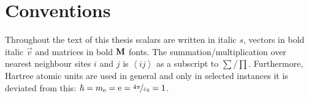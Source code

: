 \documentclass[ 10pt,
                DIV=10,
                headtopline=0.08em,
                headsepline=0.04em,
                headinclude,
                BCOR=6mm
              ]{scrbook}
\begin{document}
    
	\frontmatter
    {\hypersetup{hidelinks}\tableofcontents}%
    \section*{Conventions}
    Throughout the text of this thesis scalars are written in italic $s$, vectors in bold italic $\vec v$ and matrices in bold $\textbf M$ fonts. The summation/multiplication over nearest neighbour sites $i$ and $j$ is $\left\langle ij \right\rangle$ as a subscript to $\sum$/$\prod$. Furthermore, Hartree atomic units are used in general and only in selected instances it is deviated from this: $\hbar = m_\mathrm{e} = \mathrm e = \nicefrac{4\pi}{\varepsilon_0} = 1$. 
    \newpage
    \nonfrenchspacing

    \mainmatter
    \renewcommand{\thechapter}{\Roman{chapter}}
    
    \blinddocument
    \cleardoublepage
    \printbibliography
\end{document}
